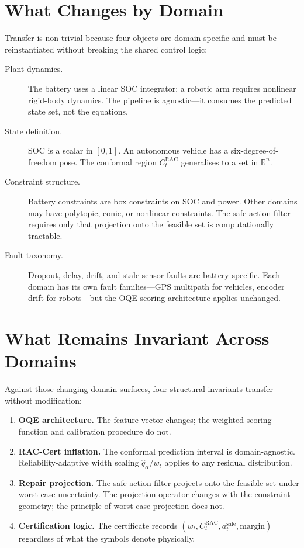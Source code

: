 \section{What Changes by Domain}

Transfer is non-trivial because four objects are domain-specific and must be
reinstantiated without breaking the shared control logic:

\begin{description}
  \item[Plant dynamics.] The battery uses a linear SOC integrator;
    a robotic arm requires nonlinear rigid-body dynamics.  The pipeline
    is agnostic---it consumes the predicted state set, not the equations.
  \item[State definition.] SOC is a scalar in $[0,1]$.  An autonomous
    vehicle has a six-degree-of-freedom pose.  The conformal region
    $C_t^{\text{RAC}}$ generalises to a set in $\mathbb{R}^n$.
  \item[Constraint structure.] Battery constraints are box constraints
    on SOC and power.  Other domains may have polytopic, conic, or
    nonlinear constraints.  The safe-action filter requires only that
    projection onto the feasible set is computationally tractable.
  \item[Fault taxonomy.] Dropout, delay, drift, and stale-sensor faults
    are battery-specific.  Each domain has its own fault families---GPS
    multipath for vehicles, encoder drift for robots---but the OQE
    scoring architecture applies unchanged.
\end{description}

\section{What Remains Invariant Across Domains}

Against those changing domain surfaces, four structural invariants transfer
without modification:

\begin{enumerate}
  \item \textbf{OQE architecture.}  The feature vector changes; the
    weighted scoring function and calibration procedure do not.
  \item \textbf{RAC-Cert inflation.}  The conformal prediction interval
    is domain-agnostic.  Reliability-adaptive width scaling
    $\hat{q}_\alpha / w_t$ applies to any residual distribution.
  \item \textbf{Repair projection.}  The safe-action filter projects
    onto the feasible set under worst-case uncertainty.  The projection
    operator changes with the constraint geometry; the principle of
    worst-case projection does not.
  \item \textbf{Certification logic.}  The certificate records
    $(w_t, C_t^{\text{RAC}}, a_t^{\text{safe}}, \text{margin})$
    regardless of what the symbols denote physically.
\end{enumerate}

